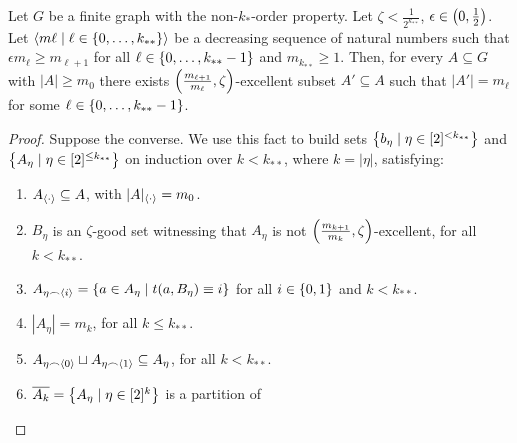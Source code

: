     \begin{lemma}[Claim 5.4.1] \label{lem:existance_of_excellent_subsets_fixed_size_choices}
        Let $G$ be a finite graph with the non-$k_{*}$-order property.
        Let $\zeta < \frac{1}{2^{k_{**}}}$, $\epsilon \in \left( 0, \frac{1}{2} \right)$.
        Let $\left< m\ell \mid \ell \in \left\{ 0, \dots, k_{**} \right\} \right>$ be a decreasing sequence of natural numbers such that
        $\epsilon m_{\ell} \geq m_{\ell+1}$ for all $\ell \in \left\{ 0, \dots, k_{**}-1 \right\}$ and $m_{k_{**}} \geq 1$.
        Then, for every $A \subseteq G$ with $|A| \geq m_0$ there exists
        $\left( \frac{m_{\ell+1}}{m_{\ell}}, \zeta \right)$-excellent subset $A' \subseteq A$ such that $|A'| = m_\ell$ for
        some $\ell \in \left\{ 0, \dots, k_{**}-1 \right\}$.
        \begin{proof}
            Suppose the converse.
            We use this fact to build sets $\left\{ b_\eta \mid \eta \in [2]^{<k_{**}} \right\}$ and
            $\left\{ A_\eta \mid \eta \in [2]^{\leq k_{**}} \right\}$ on induction over $k<k_{**}$, where $k = |\eta|$,
            satisfying:
            \begin{enumerate}
                \item\label{itm:existance_of_excellent_subsets_fixed_size_choices.1} $A_{\left< \cdot \right>} \subseteq A$, with $|A|_{\left< \cdot \right>} = m_0$.
                \item\label{itm:existance_of_excellent_subsets_fixed_size_choices.2} $B_\eta$ is an $\zeta$-good set witnessing that $A_\eta$ is not
                    $\left( \frac{m_{k+1}}{m_{k}}, \zeta \right)$-excellent, for all $k < k_{**}$.
                \item\label{itm:existance_of_excellent_subsets_fixed_size_choices.3} $A_{\eta \frown \left< i \right>} = \left\{ a \in A_\eta \mid t(a, B_\eta) \equiv i \right\}$
                    for all $i \in \left\{ 0,1 \right\}$ and $k < k_{**}$.
                \item\label{itm:existance_of_excellent_subsets_fixed_size_choices.4} $|A_{\eta}| = m_k$, for all $k \leq k_{**}$.
                \item\label{itm:existance_of_excellent_subsets_fixed_size_choices.6} $A_{\eta \frown \left< 0 \right>} \sqcup A_{\eta \frown \left< 1 \right>} \subseteq A_\eta$,
                    for all $k < k_{**}$.
                \item\label{itm:existance_of_excellent_subsets_fixed_size_choices.7} $\overline{A_k} = \left\{ A_\eta \mid \eta \in [2]^k \right\}$ is a partition of

\end{enumerate}
\end{proof}
\end{lemma}
